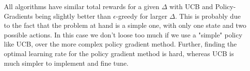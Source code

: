 \documentclass[a4paper, 11pt]{article} %
\begin{document}
All algorithms have similar total rewards for a given $\Delta$ with UCB and Policy-Gradients being slightly better than $\epsilon$-greedy for larger $\Delta$. This is probably due to the fact that the problem at hand is a simple one, with only one state and two possible actions. In this case we don't loose too much if we use a "simple" policy like UCB, over the more complex policy gradient method. Further, finding the optimal learning rate for the policy gradient method is hard, whereas UCB is much simpler to implement and fine tune. 
\end{document}
